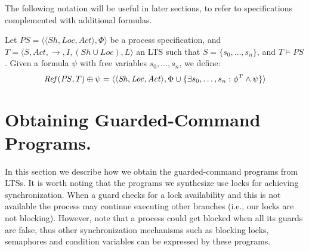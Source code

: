 The following notation will be useful in later sections, to refer to specifications complemented with additional formulas.



\begin{definition} Let $\mathit{PS}= \langle \langle \mathit{Sh},  \mathit{Loc}, \mathit{Act}\rangle, \Phi \rangle$ be a process specification, and $T=\langle S, \mathit{Act}, \rightarrow, I, (\mathit{Sh} \cup \mathit{Loc}), L\rangle$ an LTS such that $S=\{s_0,\dots,s_n\}$, and $T \vDash \mathit{PS}$. Given a formula $\psi$ with free variables $s_0,\dots,s_n$, we define:
\[
	\mathit{Ref}(\mathit{PS},T) \oplus \psi = \langle \langle \mathit{Sh}, \mathit{Loc}, \mathit{Act}\rangle, \Phi \cup \{ \exists s_0,\dots,s_n: \phi^T \wedge \psi\} \rangle
\]	
\end{definition}
\section{Obtaining Guarded-Command Programs.}
    In this section we describe how we obtain the guarded-command programs from LTSs.  It is worth noting that the programs we synthesize  use locks for achieving synchronization. When a guard checks for a lock availability and this is not available  the process may continue executing other branches (i.e., our locks are not blocking). However, note that a process could get blocked when all its guards are false, thus other synchronization mechanisms such as blocking locks, semaphores and condition variables can be expressed by these programs. 
    
